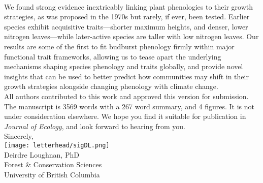 \documentclass[11pt,a4paper]{article}
\begin{document}
\vspace{1.5ex}\\
\noindent We found strong evidence inextricably linking plant phenologies to their growth strategies, as was proposed in the 1970s but rarely, if ever, been tested. Earlier species exhibit acquisitive traits---shorter maximum heights, and denser, lower nitrogen leaves---while later-active species are taller with low nitrogen leaves. Our results are some of the first to fit budburst phenology firmly within major functional trait frameworks, allowing us to tease apart the underlying mechanisms shaping species phenology and traits globally, and provide novel insights that can be used to better predict how communities may shift in their growth strategies alongside changing phenology with climate change. 
\vspace{1.5ex}\\
\noindent All authors contributed to this work and approved this version for submission. The manuscript is 3569 words with a 267 word summary, and 4 figures. It is not under consideration elsewhere. We hope you find it suitable for publication in \emph{Journal of Ecology}, and look forward to hearing from you. 
\vspace{1.5ex}\\
\noindent Sincerely, \\
\texttt{[image: letterhead/sigDL.png]} \\
\noindent Deirdre Loughnan, PhD\\
\noindent Forest \& Conservation Sciences\\
\noindent University of British Columbia

\newpage
\end{document}
